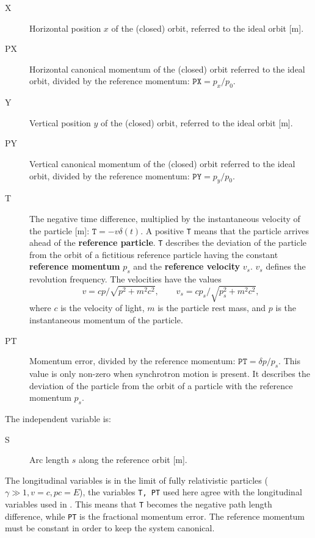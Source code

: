 \begin{description}
\item[X]
  Horizontal position $x$ of the (closed) orbit,
  referred to the ideal orbit [m].

\item[PX]
  Horizontal canonical momentum of the (closed) orbit referred
  to the ideal orbit, divided by the reference momentum:
  $\mathtt{PX} = p_x / p_0$.

\item[Y]
  Vertical position $y$ of the (closed) orbit,
  referred to the ideal orbit [m].

\item[PY]
  Vertical canonical momentum of the (closed) orbit referred
  to the ideal orbit, divided by the reference momentum:
  $\mathtt{PY} = p_y / p_0$.

\item[T]
  The negative time difference,
  multiplied by the instantaneous velocity of the particle [m]:
  $\mathtt{T} = - v \delta(t)$.
  A positive \texttt{T} means that the particle arrives ahead of the
  \textbf{reference particle}.
  \texttt{T} describes the deviation of the particle from the orbit of
  a fictitious reference particle having the constant
  \textbf{reference momentum} $p_s$ and the
  \textbf{reference velocity} $v_s$.
  $v_s$ defines the revolution frequency.
  The velocities have the values
  \[
  v = c p / \sqrt{p^2 + m^2 c^2}, \qquad
  v_s = c p_s / \sqrt{p_s^2 + m^2 c^2},
  \]
  where $c$ is the velocity of light, $m$ is the particle rest mass,
  and $p$ is the instantaneous momentum of the particle.

\item[PT]
  Momentum error, divided by the reference momentum:
  $\mathtt{PT} = \delta p / p_s$.
  This value is only non-zero when synchrotron motion is present.
  It describes the deviation of the particle from the orbit of a
  particle with the reference momentum $p_s$.
\end{description}

The independent variable is:
\begin{description}
\item[S]
  Arc length $s$ along the reference orbit [m].
\end{description}

The longitudinal variables is in the limit of fully relativistic particles
($\gamma \gg 1, v = c, p c = E$),
the variables \texttt{T, PT} used here agree with the longitudinal variables
used in .
This means that \texttt{T} becomes the negative path length difference,
while \texttt{PT} is the fractional momentum error.
The reference momentum must be constant in order to keep the system
canonical.

